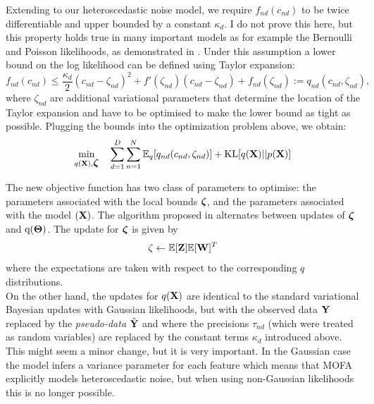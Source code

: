 Extending \cite{Seeger2012} to our heteroscedastic noise model, we require $f_{nd}(c_{nd})$ to be twice differentiable and upper bounded by a constant $\kappa_d$. I do not prove this here, but this property holds true in many important models as for example the Bernoulli and Poisson likelihoods, as demonstrated in \cite{Seeger2012}. Under this assumption a lower bound on the log likelihood can be defined using Taylor expansion:
\begin{equation*}
f_{nd}(c_{nd}) \leq \frac{\kappa_d}{2} (c_{nd} - \zeta_{nd})^2 + f'(\zeta_{nd})(c_{nd} - \zeta_{nd}) + f_{nd}(\zeta_{nd}) := q_{nd}(c_{nd},\zeta_{nd}),
\end{equation*}
where $\zeta_{nd}$ are additional variational parameters that determine the location of the Taylor expansion and have to be optimised to make the lower bound as tight as possible. Plugging the bounds into the optimization problem above, we obtain:
\begin{equation*}
\min_{q({\bf X}),\mbox{\boldmath $\zeta$}} \quad \sum_{d=1}^{D}\sum_{n=1}^{N} \mathbb{E}_q [ q_{nd}(c_{nd},\zeta_{nd})] + {\rm KL}[q({\bf X})||p({\bf X})]
\end{equation*}

The new objective function has two class of parameters to optimise: the parameters associated with the local bounds $\mbox{\boldmath $\zeta$}$, and the parameters associated with the model $({\bf X})$.
The algorithm proposed in \cite{Seeger2012} alternates between updates of $\mbox{\boldmath $\zeta$}$ and $\mathrm{q}(\mbox{\boldmath $\Theta$})$. The update for $\mbox{\boldmath $\zeta$}$ is given by
\begin{equation*}
\zeta \leftarrow \mathbb{E}[{\bf Z}]\mathbb{E}[{\bf W}]^{T}
\end{equation*}
where the expectations are taken with respect to the corresponding $q$ distributions.\\
On the other hand, the updates for $q({\bf X})$ are identical to the standard variational Bayesian updates with Gaussian likelihoods, but with the observed data ${\bf Y}$ replaced by the \textit{pseudo-data} $\hat{{\bf Y}}$ and where the precisions $\tau_{nd}$ (which were treated as random variables) are replaced by the constant terms $\kappa_d$ introduced above. This might seem a minor change, but it is very important. In the Gaussian case the model infers a variance parameter for each feature which means that MOFA explicitly models heteroscedastic noise, but when using non-Gaussian likelihoods this is no longer possible.

